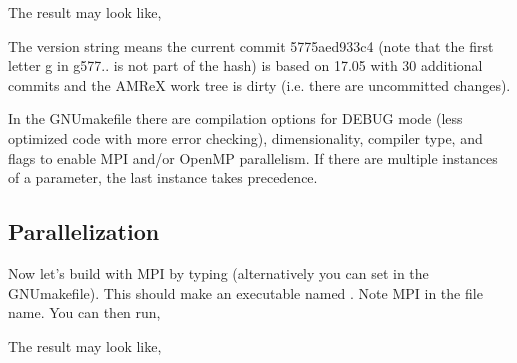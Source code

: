 \documentclass[letterpaper,10pt,english]{sphinxmanual}
\begin{document}
\sphinxAtStartPar
The result may look like,

\begin{sphinxVerbatim}[commandchars=\\\{\}]
\end{sphinxVerbatim}

\sphinxAtStartPar
The version string means the current commit 5775aed933c4 (note that the first
letter g in g577.. is not part of the hash) is based on 17.05 with 30
additional commits and the AMReX work tree is dirty (i.e. there are uncommitted
changes).

\sphinxAtStartPar
In the GNUmakefile there are compilation options for DEBUG mode (less optimized
code with more error checking), dimensionality, compiler type, and flags to
enable MPI and/or OpenMP parallelism.  If there are multiple instances of a
parameter, the last instance takes precedence.


\subsection{Parallelization}
\label{\detokenize{GettingStarted:parallelization}}
\sphinxAtStartPar
Now let’s build with MPI by typing  (alternatively you can
set  in the GNUmakefile). This should make an executable named
. Note MPI in the file name. You can then run,

\begin{sphinxVerbatim}[commandchars=\\\{\}]
\end{sphinxVerbatim}

\sphinxAtStartPar
The result may look like,

\begin{sphinxVerbatim}[commandchars=\\\{\}]
\end{sphinxVerbatim}
\end{document}
